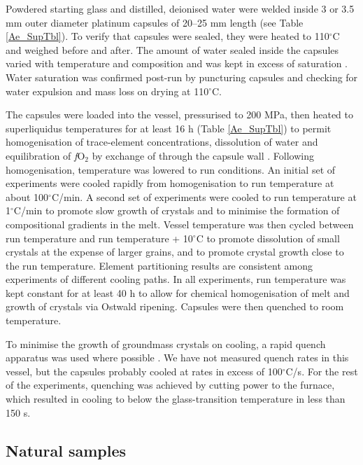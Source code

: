 \documentclass[review,authoryear,12pt]{elsarticle}
\newcommand{\dgC}{$^\circ$C }
\newcommand{\dgCs}{$^\circ$C}
\newcommand{\fO}{\textit{f}O$_{2}$ }
\begin{document}
Powdered starting glass and distilled, deionised water were welded inside 3 or 3.5 mm outer diameter platinum capsules of 20--25 mm length (see Table \ref{Ae_SupTbl}). To verify that capsules were sealed, they were heated to 110\dgC and weighed before and after. The amount of water sealed inside the capsules varied with temperature and composition and was kept in excess of saturation \citep{Carroll1997, Moore1998, Schmidt2008}. Water saturation was confirmed post-run by puncturing capsules and checking for water expulsion and mass loss on drying at 110\dgCs.

The capsules were loaded into the vessel, pressurised to 200 MPa, then heated to superliquidus temperatures for at least 16 h (Table \ref{Ae_SupTbl}) to permit homogenisation of trace-element concentrations, dissolution of water and equilibration of \fO by exchange of  through the capsule wall \citep[cf.][]{Gaillard2002}. Following homogenisation, temperature was lowered to run conditions. An initial set of experiments were cooled rapidly from homogenisation to run temperature at about 100\dgCs/min. A second set of experiments were cooled to run temperature at 1\dgCs/min to promote slow growth of crystals and to minimise the formation of compositional gradients in the melt. Vessel temperature was then cycled between run temperature and run temperature + 10\dgC to promote dissolution of small crystals at the expense of larger grains, and to promote crystal growth close to the run temperature. Element partitioning results are consistent among experiments of different cooling paths.
In all experiments, run temperature was kept constant for at least 40 h to allow for chemical homogenisation of melt and growth of crystals via Ostwald ripening. Capsules were then quenched to room temperature.

To minimise the growth of groundmass crystals on cooling, a rapid quench apparatus was used where possible \citep[Table \ref{T_Exrun}]{Berndt2002}.  We have not measured quench rates in this vessel, but the capsules probably cooled at rates in excess of 100\dgCs/s. For the rest of the experiments, quenching was achieved by cutting power to the furnace, which resulted in cooling to below the glass-transition temperature \citep[$<350$\dgCs;][]{Giordano2005} in less than 150 s.

\subsection{Natural samples}
\end{document}
